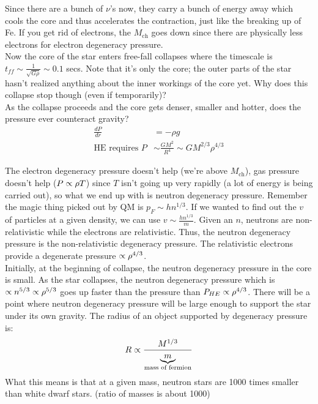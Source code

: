 Since there are a bunch of $\nu$'s now, they carry a bunch of energy away which cools the core and thus accelerates the contraction, just like the breaking up of Fe. If you get rid of electrons, the $M_{\textrm{ch}}$ goes down since there are physically less electrons for electron degeneracy pressure. \\

Now the core of the star enters free-fall collapses where the timescale is $t_{ff} \sim \frac{1}{\sqrt{G\rho}}\sim 0.1$ secs. Note that it's only the core; the outer parts of the star hasn't realized anything about the inner workings of the core yet. Why does this collapse stop though (even if temporarily)?\\

As the collapse proceeds and the core gets denser, smaller and hotter, does the pressure ever counteract gravity?
\begin{align}
\frac{dP}{dr} &= -\rho g\\
\textrm{HE requires }P &\sim \frac{ GM^2}{R^4} \sim GM^{2/3}\rho^{4/3}
\end{align}

The electron degeneracy pressure doesn't help (we're above $M_{\textrm{ch}}$), gas pressure doesn't help ($P\propto \rho T$) since $T$ isn't going up very rapidly (a lot of energy is being carried out), so what we end up with is neutron degeneracy pressure. Remember the magic thing picked out by QM is $p_F \sim hn^{1/3}$. If we wanted to find out the $v$ of particles at a given density, we can use $v \sim \frac{ hn^{1/3}}{m}$. Given an $n$, neutrons are non-relativistic while the electrons are relativistic. Thus, the neutron degeneracy pressure is the non-relativistic degeneracy pressure. The relativistic  electrons provide a degenerate pressure $\propto \rho^{4/3}$.\\

Initially, at the beginning of collapse, the neutron degeneracy pressure in the core is small. As the star collapses, the neutron degeneracy pressure which is $\propto n^{5/3} \propto \rho^{5/3}$ goes up faster than the pressure than $P_{HE} \propto \rho^{4/3}$. There will be a point where neutron degeneracy pressure will be large enough to support the star under its own gravity. The radius of an object supported by degeneracy pressure is:
\begin{align}
R \propto \frac{M^{1/3}}{\underbrace{m}_{\textrm{mass of fermion}}}
\end{align}
What this means is that at a given mass, neutron stars are 1000 times smaller than white dwarf stars. (ratio of masses is about 1000) 

